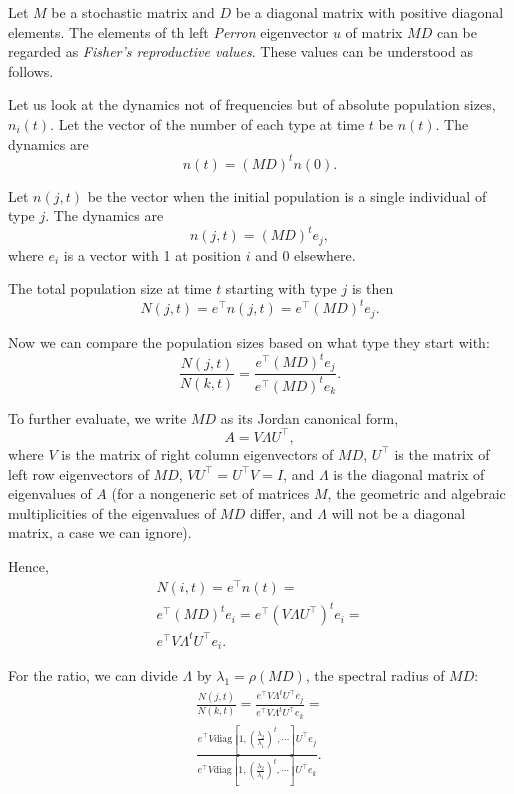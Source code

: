 \documentclass[a4paper,twocolumn]{article}   	%
\newcommand*{\tr}{^\intercal}
\newcommand{\matrx}[1]{{\left[ \stackrel{}{#1}\right]}}
\newcommand{\diag}[1]{\mbox{diag}\matrx{#1}}
\begin{document}
Let $M$ be a stochastic matrix and $D$ be a diagonal matrix with positive diagonal elements. 
The elements of th left \emph{Perron} eigenvector $u$ of matrix $MD$ can be regarded as \emph{Fisher's reproductive values}.
These values can be understood as follows.

Let us look at the dynamics not of frequencies but of absolute
population sizes, $n_i(t)$.
Let the vector of the number of each type at time $t$ be $n(t)$.
The dynamics are
$$
n(t) = (MD)^t n(0).
$$

Let $n(j, t)$ be the vector when the initial population is a single individual of type $j$.
The dynamics are
$$
n(j,t) = (MD)^t e_j,
$$
where $e_i$ is a vector with 1 at position $i$ and 0 elsewhere.

The total population size at time $t$ starting with type $j$ is then
$$
N(j,t) = e\tr n(j,t) = e\tr (MD)^t e_j.
$$

Now we can compare the population sizes based on what type they start
with:
$$
\frac{N(j,t)}{N(k,t)} = \frac{e\tr (MD)^t e_j}{e\tr (MD)^t e_k}.
$$

To further evaluate, we write $MD$ as its Jordan canonical form, 
$$
A = V \Lambda U\tr,
$$
where $V$ is the matrix of right column eigenvectors of $MD$,
$U\tr$ is the matrix of left row eigenvectors of $MD$,
$V U\tr = U\tr V = I$, 
and $\Lambda$ is the diagonal matrix of
eigenvalues of $A$ (for a nongeneric set of matrices $M$, the
geometric and algebraic multiplicities of the eigenvalues of $MD$
differ, and $\Lambda$ will not be a diagonal matrix, a case we can
ignore).

Hence,
\begin{multline*}
N(i, t) = 
e\tr n(t) = \\
e\tr (MD)^t e_i =
e\tr  (V \Lambda U\tr)^t e_i = \\
e\tr V \Lambda^t U\tr e_i.
\end{multline*}

For the ratio, we can divide $\Lambda$ by $\lambda_1 = \rho(MD)$,
the spectral radius of $MD$:
\begin{multline*}
\frac{N(j,t)}{N(k,t)} =
\frac{ e\tr V \Lambda^t U\tr e_j}{ e\tr V \Lambda^t U\tr e_k} = \\
\frac{ e\tr V \diag{1, (\frac{\lambda_2}{\lambda_1})^t, \cdots} U\tr e_j} { e\tr V \diag{1,(\frac{\lambda_2}{\lambda_1})^t, \cdots} U\tr e_k}.
\end{multline*}
\end{document}
